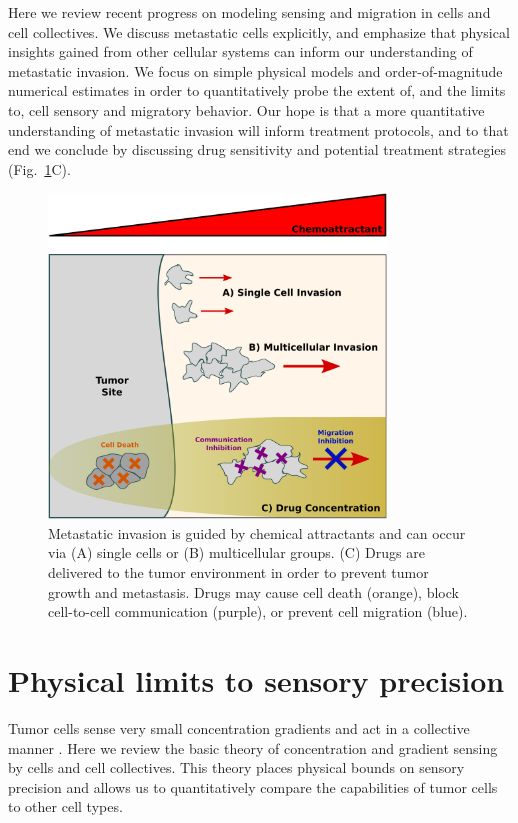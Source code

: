 Here we review recent progress on modeling sensing and migration in cells and cell collectives. We discuss metastatic cells explicitly, and emphasize that physical insights gained from other cellular systems can inform our understanding of metastatic invasion. We focus on simple physical models and order-of-magnitude numerical estimates in order to quantitatively probe the extent of, and the limits to, cell sensory and migratory behavior. Our hope is that a more quantitative understanding of metastatic invasion will inform treatment protocols, and to that end we conclude by discussing drug sensitivity and potential treatment strategies (Fig.\ \ref{overview}C).



\begin{figure}[ht]
    \centering
        \includegraphics[width=0.8\textwidth]{../fig/ch1_fig1.pdf}
    \caption{Metastatic invasion is guided by chemical attractants and can occur via (A) single cells or (B) multicellular groups. (C) Drugs are delivered to the tumor environment in order to prevent tumor growth and metastasis. Drugs may cause cell death (orange), block cell-to-cell communication (purple), or prevent cell migration (blue).}
\label{overview}
\end{figure}



\section{Physical limits to sensory precision}

Tumor cells sense very small concentration gradients \cite{shields2007autologous} and act in a collective manner \cite{cheung2013collective, friedl2012classifying, aceto2014circulating, puliafito2015three}. Here we review the basic theory of concentration and gradient sensing by cells and cell collectives. This theory places physical bounds on sensory precision and allows us to quantitatively compare the capabilities of tumor cells to other cell types.

